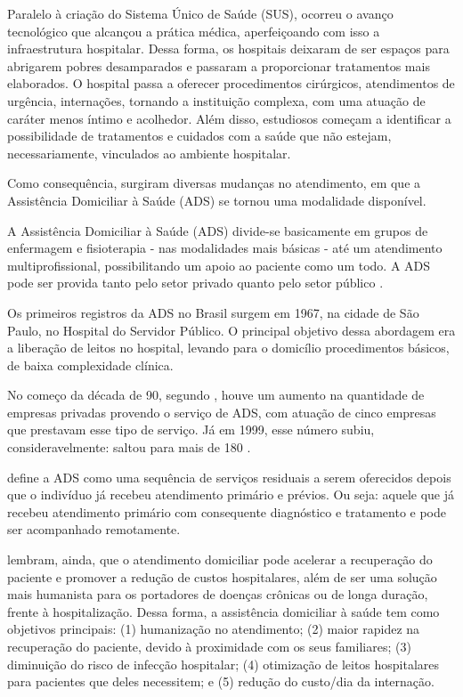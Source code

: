 Paralelo à criação do Sistema Único de Saúde (SUS), ocorreu o avanço
tecnológico que alcançou a prática médica, aperfeiçoando com isso a
infraestrutura hospitalar. Dessa forma, os hospitais deixaram de ser espaços
para abrigarem pobres desamparados e passaram a proporcionar tratamentos mais
elaborados. O hospital passa a oferecer  procedimentos cirúrgicos, atendimentos
de urgência, internações, tornando a instituição complexa, com uma atuação de
caráter menos íntimo e acolhedor. Além disso, estudiosos começam a identificar
a possibilidade de tratamentos e cuidados com a  saúde que não estejam,
necessariamente, vinculados ao ambiente hospitalar.

Como consequência, surgiram diversas mudanças no atendimento, em que a Assistência
Domiciliar à Saúde (ADS) se tornou uma modalidade disponível.

A Assistência Domiciliar à Saúde (ADS) divide-se basicamente em grupos de
enfermagem e fisioterapia - nas modalidades mais básicas - até um atendimento
multiprofissional, possibilitando um apoio ao paciente como um todo. A ADS pode
ser provida tanto pelo setor privado quanto pelo setor público
\cite{amaral2001assistencia}.

Os primeiros registros da ADS no Brasil surgem em 1967, na cidade de São
Paulo, no Hospital do Servidor Público. O principal objetivo dessa abordagem
era a liberação de leitos no hospital, levando para o domicílio procedimentos
básicos, de baixa complexidade clínica.

No começo da década de 90, segundo ,
houve um aumento na quantidade de empresas privadas provendo o serviço de ADS,
com atuação de cinco empresas que prestavam esse tipo de  serviço. Já em 1999,
esse número subiu, consideravelmente: saltou para mais de 180
\cite{tavolari2000desenvolvimento}.

 define a ADS como uma sequência de serviços
residuais a serem oferecidos depois que o indivíduo já recebeu atendimento
primário e prévios. Ou seja: aquele que já recebeu atendimento primário com
consequente diagnóstico e tratamento e pode ser acompanhado remotamente.

 lembram, ainda, que o atendimento domiciliar
pode acelerar a recuperação do  paciente e promover a redução de custos
hospitalares, além de ser uma solução mais  humanista para os portadores de
doenças crônicas ou de longa duração, frente à  hospitalização. Dessa forma, a
assistência domiciliar à saúde tem como objetivos principais: (1) humanização
no atendimento; (2) maior rapidez na recuperação do paciente, devido à
proximidade com os seus familiares; (3) diminuição do risco de infecção
hospitalar; (4) otimização de leitos hospitalares para pacientes que deles
necessitem; e (5) redução do custo/dia da internação.

